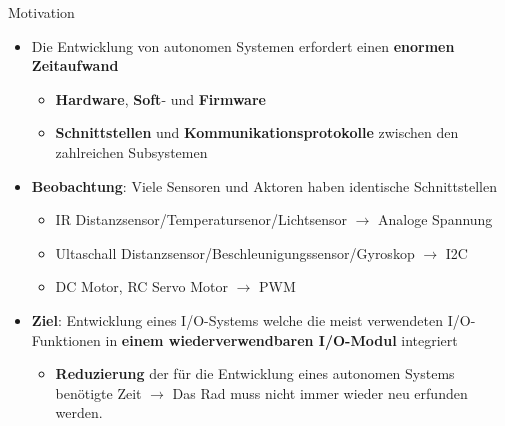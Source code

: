 \documentclass{beamer}
\begin{document}
\begin{frame}{Motivation}
\begin{itemize}
 \item Die Entwicklung von autonomen Systemen erfordert einen \textbf{enormen Zeitaufwand}
 \begin{itemize}
  \item \textbf{Hardware}, \textbf{Soft}- und \textbf{Firmware}
  \item \textbf{Schnittstellen} und \textbf{Kommunikationsprotokolle} zwischen den zahlreichen Subsystemen
 \end{itemize}
\end{itemize}
\begin{itemize}
 \item \textbf{Beobachtung}: Viele Sensoren und Aktoren haben identische Schnittstellen
 \begin{itemize}
  \item IR Distanzsensor/Temperatursenor/Lichtsensor  $\rightarrow$ Analoge Spannung
  \item Ultaschall Distanzsensor/Beschleunigungssensor/Gyroskop $\rightarrow$ I2C
  \item DC Motor, RC Servo Motor $\rightarrow$ PWM
 \end{itemize}
 \end{itemize}
\begin{itemize}
 \item \textbf{Ziel}: Entwicklung eines I/O-Systems welche die meist verwendeten I/O-Funktionen in \textbf{einem wiederverwendbaren I/O-Modul} integriert
 \begin{itemize}
  \item \textbf{Reduzierung} der f\"ur die Entwicklung eines autonomen Systems ben\"otigte Zeit $\rightarrow$ Das Rad muss nicht immer wieder neu erfunden werden.
 \end{itemize}
\end{itemize}
\end{frame}
\end{document}
